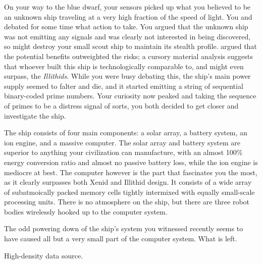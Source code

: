 \documentclass[char]{guildcamp1}
\begin{document}
On your way to the blue dwarf, your sensors picked up what you believed to be an unknown ship traveling at a very high fraction of the speed of light. You and \cAlien{\they} debated for some time what action to take. You argued that the unknown ship was not emitting any signals and was clearly not interested in being discovered, so might destroy your small scout ship to maintain its stealth profile. \cAlien{\they} argued that the potential benefits outweighted the risks; a cursory material analysis suggests that whoever built this ship is technologically comparable to, and might even surpass, the \emph{Illithids}. While you were busy debating this, the ship's main power supply seemed to falter and die, and it started emitting a string of sequential binary-coded prime numbers. Your curiosity now peaked and taking the sequence of primes to be a distress signal of sorts, you both decided to get closer and investigate the ship.

The ship consists of four main components: a solar array, a battery system, an ion engine, and a massive computer. The solar array and battery system are superior to anything your civilization can manufacture, with an almost 100\% energy conversion ratio and almost no passive battery loss, while the ion engine is mediocre at best. The computer however is the part that fascinates you the most, as it clearly surpasses both Xenid and Illithid design. It consists of a wide array of subatmoically packed memory cells tightly intermixed with equally small-scale processing units. There is no atmosphere on the ship, but there are three robot bodies wirelessly hooked up to the computer system.

The odd powering down of the ship's system you witnessed recently seems to have caused all but a very small part of the computer system. What is left.

High-density data source.

\begin{contacts}
  \contact{\cActive{}} 
\end{contacts}
\end{document}

